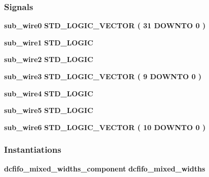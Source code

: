 \subsubsection*{Signals}
 \begin{DoxyCompactItemize}
\item 
{\bf sub\+\_\+wire0} {\bfseries \textcolor{comment}{S\+T\+D\+\_\+\+L\+O\+G\+I\+C\+\_\+\+V\+E\+C\+T\+OR}\textcolor{vhdlchar}{ }\textcolor{vhdlchar}{(}\textcolor{vhdlchar}{ }\textcolor{vhdlchar}{ } \textcolor{vhdldigit}{31} \textcolor{vhdlchar}{ }\textcolor{keywordflow}{D\+O\+W\+N\+TO}\textcolor{vhdlchar}{ }\textcolor{vhdlchar}{ } \textcolor{vhdldigit}{0} \textcolor{vhdlchar}{ }\textcolor{vhdlchar}{)}\textcolor{vhdlchar}{ }} 
\item 
{\bf sub\+\_\+wire1} {\bfseries \textcolor{comment}{S\+T\+D\+\_\+\+L\+O\+G\+IC}\textcolor{vhdlchar}{ }} 
\item 
{\bf sub\+\_\+wire2} {\bfseries \textcolor{comment}{S\+T\+D\+\_\+\+L\+O\+G\+IC}\textcolor{vhdlchar}{ }} 
\item 
{\bf sub\+\_\+wire3} {\bfseries \textcolor{comment}{S\+T\+D\+\_\+\+L\+O\+G\+I\+C\+\_\+\+V\+E\+C\+T\+OR}\textcolor{vhdlchar}{ }\textcolor{vhdlchar}{(}\textcolor{vhdlchar}{ }\textcolor{vhdlchar}{ } \textcolor{vhdldigit}{9} \textcolor{vhdlchar}{ }\textcolor{keywordflow}{D\+O\+W\+N\+TO}\textcolor{vhdlchar}{ }\textcolor{vhdlchar}{ } \textcolor{vhdldigit}{0} \textcolor{vhdlchar}{ }\textcolor{vhdlchar}{)}\textcolor{vhdlchar}{ }} 
\item 
{\bf sub\+\_\+wire4} {\bfseries \textcolor{comment}{S\+T\+D\+\_\+\+L\+O\+G\+IC}\textcolor{vhdlchar}{ }} 
\item 
{\bf sub\+\_\+wire5} {\bfseries \textcolor{comment}{S\+T\+D\+\_\+\+L\+O\+G\+IC}\textcolor{vhdlchar}{ }} 
\item 
{\bf sub\+\_\+wire6} {\bfseries \textcolor{comment}{S\+T\+D\+\_\+\+L\+O\+G\+I\+C\+\_\+\+V\+E\+C\+T\+OR}\textcolor{vhdlchar}{ }\textcolor{vhdlchar}{(}\textcolor{vhdlchar}{ }\textcolor{vhdlchar}{ } \textcolor{vhdldigit}{10} \textcolor{vhdlchar}{ }\textcolor{keywordflow}{D\+O\+W\+N\+TO}\textcolor{vhdlchar}{ }\textcolor{vhdlchar}{ } \textcolor{vhdldigit}{0} \textcolor{vhdlchar}{ }\textcolor{vhdlchar}{)}\textcolor{vhdlchar}{ }} 
\end{DoxyCompactItemize}
\subsubsection*{Instantiations}
 \begin{DoxyCompactItemize}
\item 
{\bf dcfifo\+\_\+mixed\+\_\+widths\+\_\+component}  {\bfseries dcfifo\+\_\+mixed\+\_\+widths}   
\end{DoxyCompactItemize}


